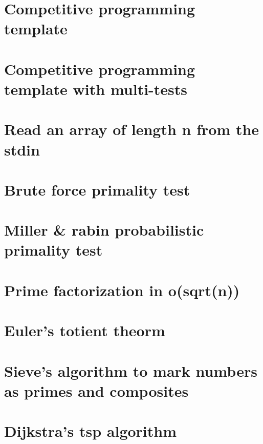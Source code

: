 \section{Competitive programming template}
\raggedbottom

\section{Competitive programming template with multi-tests}
\raggedbottom

\section{Read an array of length n from the stdin}
\raggedbottom

\section{Brute force primality test}
\raggedbottom

\section{Miller \& rabin probabilistic primality test}
\raggedbottom

\section{Prime factorization in o(sqrt(n))}
\raggedbottom

\section{Euler's totient theorm}
\raggedbottom

\section{Sieve's algorithm to mark numbers as primes and composites}
\raggedbottom

\section{Dijkstra's tsp algorithm}
\raggedbottom

